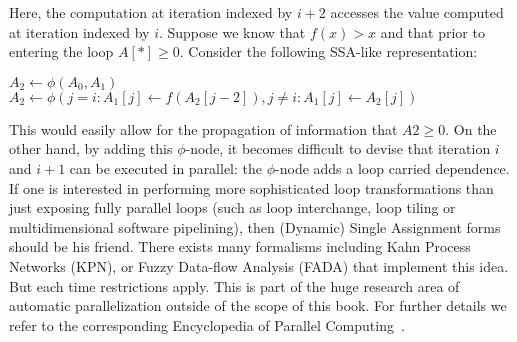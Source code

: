 \noindent
Here, the computation at iteration indexed by $i+2$ accesses the value computed at iteration indexed by $i$. Suppose we know that $f(x)>x$ and that prior to entering the loop $A[*]\geq 0$.
Consider the following SSA-like representation:

{
\LinesNotNumbered
\begin{algorithm}[H]
   {
    $A_2 \gets \phi(A_0,A_1)$\; 
    $A_2 \gets \phi(j=i : A_1[j] \gets f(A_2[j-2]), j\neq i:A_1[j] \gets A_2[j])$\;
  }
\end{algorithm}
}

\noindent
This would easily allow for the propagation of information that $A2\geq 0$. On the other hand, by adding this $\phi$-node, it becomes difficult to devise that iteration $i$ and $i+1$ can be executed in parallel: the $\phi$-node adds a loop carried dependence. If one is interested in performing more sophisticated loop transformations than just exposing fully parallel loops (such as loop interchange, loop tiling or multidimensional software pipelining), then (Dynamic) Single Assignment forms should be his friend. There exists many formalisms including Kahn Process Networks (KPN), or Fuzzy Data-flow Analysis (FADA) that implement this idea. But each time restrictions apply. This is part of the huge research area of automatic parallelization outside of the scope of this book. For further details we refer to the corresponding Encyclopedia of Parallel Computing~\cite{Padua}.
